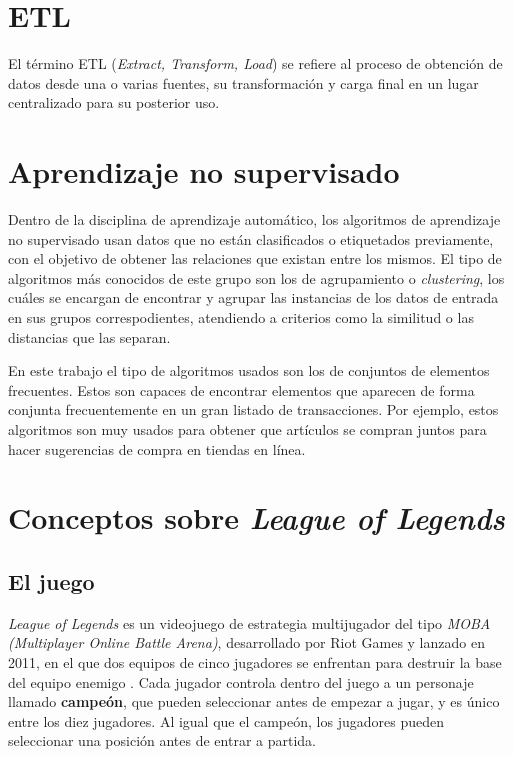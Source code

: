 
\section{ETL}
El término ETL (\textit{Extract, Transform, Load}) se refiere al proceso de obtención de datos desde una o varias fuentes, su transformación y carga final en un lugar centralizado para su posterior uso.

\section{Aprendizaje no supervisado}
Dentro de la disciplina de aprendizaje automático, los algoritmos de aprendizaje no supervisado usan datos que no están clasificados o etiquetados previamente, con el objetivo de obtener las relaciones que existan entre los mismos. El tipo de algoritmos más conocidos de este grupo son los de agrupamiento o \textit{clustering}, los cuáles se encargan de encontrar y agrupar las instancias de los datos de entrada en sus grupos correspodientes, atendiendo a criterios como la similitud o las distancias que las separan.

En este trabajo el tipo de algoritmos usados son los de conjuntos de elementos frecuentes. Estos son capaces de encontrar elementos que aparecen de forma conjunta frecuentemente en un gran listado de transacciones. Por ejemplo, estos algoritmos son muy usados para obtener que artículos se compran juntos para hacer sugerencias de compra en tiendas en línea.

\section{Conceptos sobre \textit{League of Legends}}
\label{sec:lol-conceptos}
\subsection{El juego}
\textit{League of Legends} es un videojuego de estrategia multijugador del tipo \textit{MOBA (Multiplayer Online Battle Arena)}, desarrollado por Riot Games y lanzado en 2011, en el que dos equipos de cinco jugadores se enfrentan para destruir la base del equipo enemigo \cite{misc:como-jugar}. Cada jugador controla dentro del juego a un personaje llamado \textbf{campeón}, que pueden seleccionar antes de empezar a jugar, y es único entre los diez jugadores. Al igual que el campeón, los jugadores pueden seleccionar una posición antes de entrar a partida.


